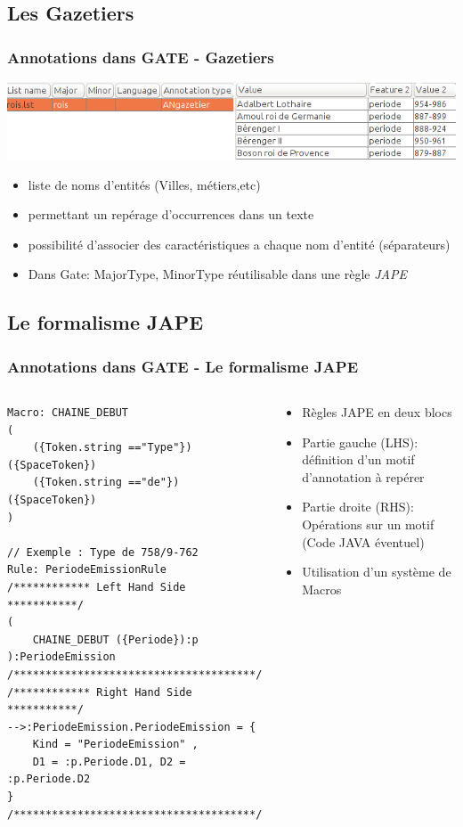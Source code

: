 \documentclass[10pt, compress]{beamer}
\begin{document}
\subsection{Les Gazetiers}
\begin{frame}[fragile]
\frametitle{Annotations dans GATE - Gazetiers}
	\includegraphics[scale=0.4]{img/gazetier.png} 
		\begin{itemize}[<+->]
			\item{liste de noms d'entités (Villes, métiers,etc)}
			\item{permettant un repérage d’occurrences dans un texte}
			\item{possibilité d'associer des caractéristiques a chaque nom d'entité (séparateurs)}
			\item{Dans Gate: MajorType, MinorType réutilisable dans une règle \textit{JAPE}}
		\end{itemize}
\end{frame}

\subsection{Le formalisme JAPE}
\begin{frame}[fragile]
\frametitle{Annotations dans GATE - Le formalisme JAPE}
\begin{columns}
	\begin{scriptsize}
\begin{lstlisting}
Macro: CHAINE_DEBUT
(
    ({Token.string =="Type"})({SpaceToken})
    ({Token.string =="de"})({SpaceToken})
)

// Exemple : Type de 758/9-762
Rule: PeriodeEmissionRule
/************ Left Hand Side ***********/
(
    CHAINE_DEBUT ({Periode}):p
):PeriodeEmission
/**************************************/
/************ Right Hand Side ***********/
-->:PeriodeEmission.PeriodeEmission = {
 	Kind = "PeriodeEmission" ,
 	D1 = :p.Periode.D1, D2 = :p.Periode.D2
}
/**************************************/
\end{lstlisting}
\end{scriptsize}
	\begin{scriptsize}
	\begin{itemize}
	[square]
	\item{Règles JAPE en deux blocs}
	\item{Partie gauche (LHS): définition d'un motif d'annotation à repérer}
	\item{Partie droite (RHS): Opérations sur un motif (Code JAVA éventuel)}
	\item{Utilisation d'un système de Macros}
	\end{itemize}
	\end{scriptsize}
\end{columns}
\end{frame}
\end{document}
